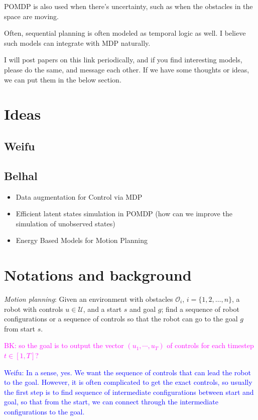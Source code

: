 \documentclass{article}
\begin{document}
POMDP is also used when there's uncertainty, such as when the obstacles in the space are moving. 

Often, sequential planning is often modeled as temporal logic as well. I believe such models can integrate with MDP naturally. 

I will post papers on this link periodically, and if you find interesting models, please do the same, and message each other. If we have some thoughts or ideas, we can put them in the below section. 



\section{Ideas}

\subsection{Weifu}

\subsection{Belhal}
\begin{itemize}
\item Data augmentation for Control via MDP
\item Efficient latent states simulation in POMDP (how can we improve the simulation of unobserved states)
\item Energy Based Models for Motion Planning
\end{itemize}


\section{Notations and background}

\noindent\textit{Motion planning}: Given an environment with obstacles $\mathcal{O}_i$, $i = \{1, 2, \ldots, n\}$, a robot with controls $u\in\mathcal{U}$, and a start $s$ and goal $g$; find a sequence of robot configurations or a sequence of controls so that the robot can go to the goal $g$ from start $s$. 

\textcolor{magenta}{BK: so the goal is to output the vector $(u_1, \cdots, u_T)$ of controls for each timestep $t \in [1, T]$?}

\textcolor{blue}{Weifu: In a sense, yes. We want the sequence of controls that can lead the robot to the goal. However, it is often complicated to get the exact controls, so usually the first step is to find sequence of intermediate configurations between start and goal, so that from the start, we can connect through the intermediate configurations to the goal. }
\end{document}
